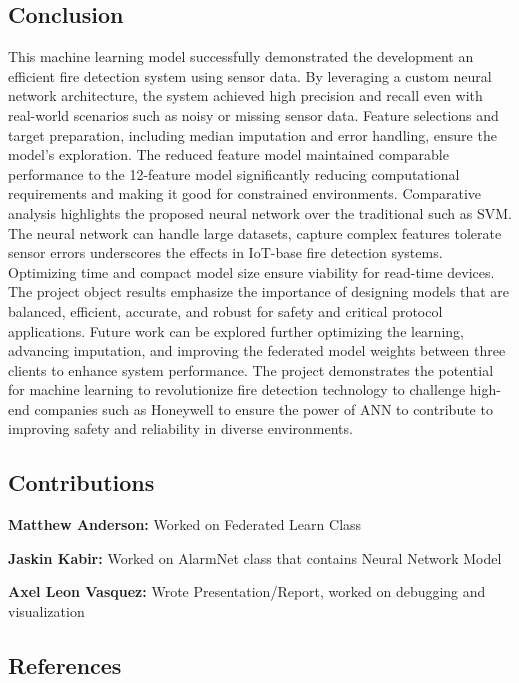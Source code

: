 \documentclass[conference]{IEEEtran}
\begin{document}
\subsection{Conclusion}
This machine learning model successfully demonstrated the development an efficient fire detection system using sensor data. By leveraging a custom neural network architecture, the system achieved high precision and recall even with real-world scenarios such as noisy or missing sensor data. Feature selections and target preparation, including median imputation and error handling, ensure the model's exploration. The reduced feature model maintained comparable performance to the 12-feature model significantly reducing computational requirements and making it good for constrained environments. Comparative analysis highlights the proposed neural network over the traditional such as SVM. The neural network can handle large datasets, capture complex features tolerate sensor errors underscores the effects in IoT-base fire detection systems. Optimizing time and compact model size ensure viability for read-time devices. The project object results emphasize the importance of designing models that are balanced, efficient, accurate, and robust for safety and critical protocol applications. Future work can be explored further optimizing the learning, advancing imputation, and improving the federated model weights between three clients to enhance system performance. The project demonstrates the potential for machine learning to revolutionize fire detection technology to challenge high-end companies such as Honeywell to ensure the power of ANN to contribute to improving safety and reliability in diverse environments.






\subsection{Contributions}
\textbf{Matthew Anderson:} Worked on Federated Learn Class

\textbf{Jaskin Kabir:} Worked on AlarmNet class that contains Neural Network Model

\textbf{Axel Leon Vasquez:} Wrote Presentation/Report, worked on debugging and visualization

\subsection{References}


\end{document}
